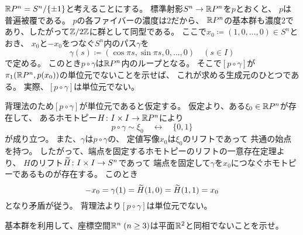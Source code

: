 \documentclass[report]{jlreq}
\begin{document}
\begin{answer}
    $\mathbb{R} P^n = S^n / \{ \pm 1 \}$と考えることにする。
   標準射影$S^n \to \mathbb{R} P^n$を$p$とおくと、
    $p$は普遍被覆である。
    $p$の各ファイバーの濃度は$2$だから、
    $\mathbb{R} P^n$の基本群も濃度$2$であり、したがって$\mathbb{Z} / 2\mathbb{Z}$に群として同型である。
    ここで$x_0 \coloneqq (1, 0, \dots, 0) \in S^n$とおき、
    $x_0$と$-x_0$をつなぐ$S^n$内のパス$\gamma$を
    \begin{equation}
        \gamma(s) \coloneqq (\cos \pi s, \sin \pi s, 0, \dots, 0)
        \quad (s \in I)
    \end{equation}
    で定める。
    このとき$p \circ \gamma$は$\mathbb{R} P^n$内のループとなる。
    そこで$[p \circ \gamma]$が$\pi_1(\mathbb{R} P^n, p(x_0))$の単位元でないことを示せば、
    これが求める生成元のひとつである。
    実際、$[p \circ \gamma]$は単位元でない。
    \begin{innerproof}
        背理法のため$[p \circ \gamma]$が単位元であると仮定する。
        仮定より、ある$\xi_0 \in \mathbb{R} P^n$が存在して、
        あるホモトピー$H \colon I \times I \to \mathbb{R} P^n$により
        \begin{equation}
            p \circ \gamma \sim \xi_0 \quad \rel \quad \{ 0, 1 \}
        \end{equation}
        が成り立つ。
        また、$\gamma$は$p \circ \gamma$の、
        定値写像$x_0$は$\xi_0$のリフトであって
        共通の始点を持つ。
        したがって、端点を固定するホモトピーのリフトの一意存在定理より、
        $H$のリフト$\widetilde{H} \colon I \times I \to S^n$であって
        端点を固定して$\gamma$を$x_0$につなぐホモトピーであるものが存在する。
        このとき
        \begin{equation}
            -x_0 = \gamma(1) = \widetilde{H}(1, 0) = \widetilde{H}(1, 1) = x_0
        \end{equation}
        となり矛盾が従う。
        背理法より$[p \circ \gamma]$は単位元でない。
    \end{innerproof}
\end{answer}

\begin{problem}[幾何学II 4.4]
    基本群を利用して、座標空間$\mathbb{R}^n \; (n \ge 3)$は平面$\mathbb{R}^2$と同相でないことを示せ。
\end{problem}
\end{document}
